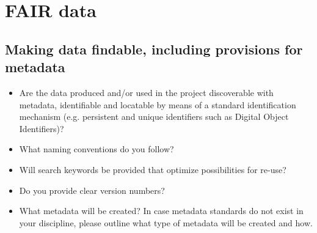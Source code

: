 \documentclass{article}
\begin{document}
\section{FAIR data}
\subsection{Making data findable, including provisions for metadata}
\begin{itemize}
    \item Are the data produced and/or used in the project discoverable with metadata, identifiable and locatable by means of a standard identification mechanism (e.g. persistent and unique identifiers such as Digital Object Identifiers)?
    \item What naming conventions do you follow?
    \item Will search keywords be provided that optimize possibilities for re-use?
    \item Do you provide clear version numbers?
    \item What metadata will be created? In case metadata standards do not exist in your discipline, please outline what type of metadata will be created and how.
\end{itemize}
\end{document}
